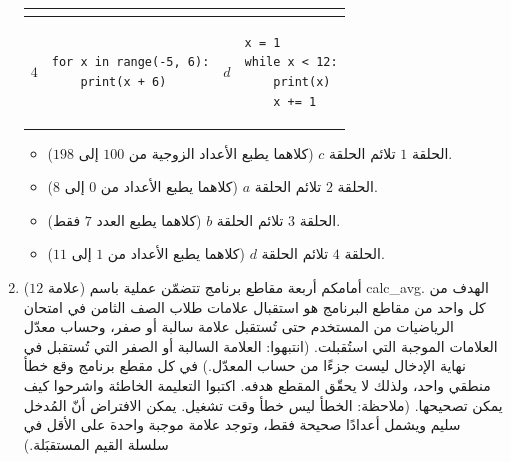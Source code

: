 \documentclass[14pt]{extarticle}
\begin{document}
\begin{enumerate}[label=\textbf{السؤال \arabic*:}, wide=0pt, itemsep=2.2em]
{\begin{longtable}{|C{0.9cm}|p{5.8cm}|C{0.9cm}|p{5.8cm}|}
\begin{pycell}
\end{pycell}
\\ \hline
$4$ &
\begin{pycell}
\begin{english}
\begin{verbatim}
for x in range(-5, 6):
    print(x + 6)
\end{verbatim}
\end{english}
\end{pycell}
& $d$ &
\begin{pycell}
\begin{english}
\begin{verbatim}
x = 1
while x < 12:
    print(x)
    x += 1
\end{verbatim}
\end{english}
\end{pycell}
\\ \hline
\end{longtable}}

\ifwithsols
\begin{boxSolution}
\begin{itemize}
\item الحلقة $1$ تلائم الحلقة $c$ (كلاهما يطبع الأعداد الزوجية من $100$ إلى $198$).
\item الحلقة $2$ تلائم الحلقة $a$ (كلاهما يطبع الأعداد من $0$ إلى $8$).
\item الحلقة $3$ تلائم الحلقة $b$ (كلاهما يطبع العدد $7$ فقط).
\item الحلقة $4$ تلائم الحلقة $d$ (كلاهما يطبع الأعداد من $1$ إلى $11$).
\end{itemize}
\end{boxSolution}
\fi
\filbreak

\item ($12$ علامة) أمامكم أربعة مقاطع برنامج تتضمّن عملية باسم \textenglish{calc\_avg}.
الهدف من كل واحد من مقاطع البرنامج هو استقبال علامات طلاب الصف الثامن في امتحان الرياضيات من المستخدم حتى تُستقبل علامة سالبة أو صفر، وحساب معدّل العلامات الموجبة التي استُقبلت.
(انتبهوا: العلامة السالبة أو الصفر التي تُستقبل في نهاية الإدخال ليست جزءًا من حساب المعدّل.)
في كل مقطع برنامج وقع خطأ منطقي واحد، ولذلك لا يحقّق المقطع هدفه. اكتبوا التعليمة الخاطئة واشرحوا كيف يمكن تصحيحها.
(ملاحظة: الخطأ ليس خطأ وقت تشغيل. يمكن الافتراض أنّ المُدخل سليم ويشمل أعدادًا صحيحة فقط، وتوجد علامة موجبة واحدة على الأقل في سلسلة القيم المستقبَلة.)

\begin{enumerate}[label=\textbf{مقطع \alph*:}, wide=0pt, itemsep=1.5em]


\end{enumerate}
\end{enumerate}
\end{document}
